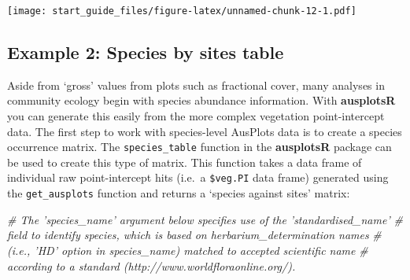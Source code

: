 \documentclass[
]{article}
\newenvironment{Shaded}{\begin{snugshade}}{\end{snugshade}}
\newcommand{\CommentTok}[1]{\textcolor[rgb]{0.56,0.35,0.01}{\textit{#1}}}
\begin{document}
\texttt{[image: start\_guide\_files/figure-latex/unnamed-chunk-12-1.pdf]}

\hypertarget{example-2-species-by-sites-table}{%
\subsection{Example 2: Species by sites
table}\label{example-2-species-by-sites-table}}

Aside from `gross' values from plots such as fractional cover, many
analyses in community ecology begin with species abundance information.
With \textbf{ausplotsR} you can generate this easily from the more
complex vegetation point-intercept data. The first step to work with
species-level AusPlots data is to create a species occurrence matrix.
The \texttt{species\_table} function in the \textbf{ausplotsR} package
can be used to create this type of matrix. This function takes a data
frame of individual raw point-intercept hits (i.e.~a \texttt{\$veg.PI}
data frame) generated using the \texttt{get\_ausplots} function and
returns a `species against sites' matrix:

\begin{Shaded}
\end{Shaded}

\begin{Shaded}
\begin{Highlighting}[]
\CommentTok{# The 'species_name' argument below specifies use of the 'standardised_name'}
\CommentTok{# field to identify species, which is based on herbarium_determination names}
\CommentTok{# (i.e., 'HD' option in species_name) matched to accepted scientific name}
\CommentTok{# according to a standard (http://www.worldfloraonline.org/).}
\end{Highlighting}
\end{Shaded}
\end{document}
